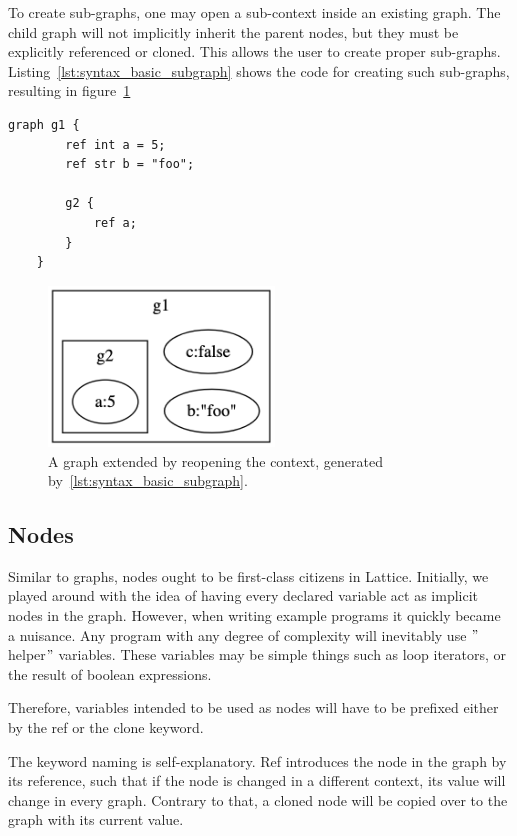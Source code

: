 To create sub-graphs, one may open a sub-context inside an existing graph.
The child graph will not implicitly inherit the parent nodes, but they must be explicitly referenced or cloned.
This allows the user to create proper sub-graphs.
Listing~\ref{lst:syntax_basic_subgraph} shows the code for creating such sub-graphs, resulting in figure~\ref{fig:syntax_basic_subgraph}

\begin{lstlisting}[caption={Creating a sub-graph g2 in the context of g1},captionpos=b, label={lst:syntax_basic_subgraph}]
    graph g1 {
        ref int a = 5;
        ref str b = "foo";

        g2 {
            ref a;
        }
    }
\end{lstlisting}
\begin{figure}[H]
    \centering
    \includegraphics[width=6cm]{figures/syntax_section/syntax_basic_subgraph}
    \caption{A graph extended by reopening the context, generated by~\ref{lst:syntax_basic_subgraph}.}
    \label{fig:syntax_basic_subgraph}
\end{figure}

\subsection{Nodes}\label{subsec:syntax_nodes}
Similar to graphs, nodes ought to be first-class citizens in Lattice.
Initially, we played around with the
idea of having every declared variable act as implicit nodes in the graph.
However, when writing example programs it quickly became a nuisance.
Any program with any degree of complexity will inevitably use \("\)helper\("\) variables.
These variables may be simple things such as loop iterators, or the result of boolean expressions.

Therefore, variables intended to be used as nodes will have to be prefixed either by the ref or the clone keyword.

The keyword naming is self-explanatory.
Ref introduces the node in the graph by its reference, such that if
the node is changed in a different context, its value will change in every graph.
Contrary to that, a cloned node
will be copied over to the graph with its current value.

